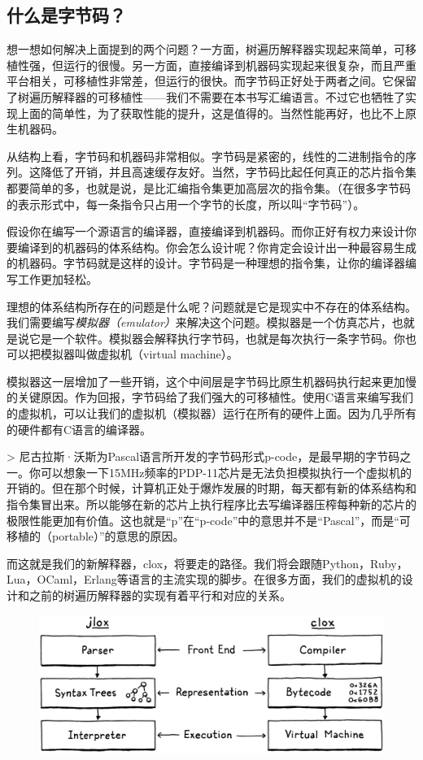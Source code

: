\documentclass[cn,10pt,math=newtx,citestyle=gb7714-2015,bibstyle=gb7714-2015]{elegantbook}
\begin{document}
\subsection{什么是字节码？}

想一想如何解决上面提到的两个问题？一方面，树遍历解释器实现起来简单，可移植性强，但运行的很慢。另一方面，直接编译到机器码实现起来很复杂，而且严重平台相关，可移植性非常差，但运行的很快。而字节码正好处于两者之间。它保留了树遍历解释器的可移植性——我们不需要在本书写汇编语言。不过它也牺牲了实现上面的简单性，为了获取性能的提升，这是值得的。当然性能再好，也比不上原生机器码。

从结构上看，字节码和机器码非常相似。字节码是紧密的，线性的二进制指令的序列。这降低了开销，并且高速缓存友好。当然，字节码比起任何真正的芯片指令集都要简单的多，也就是说，是比汇编指令集更加高层次的指令集。（在很多字节码的表示形式中，每一条指令只占用一个字节的长度，所以叫“字节码”）。

假设你在编写一个源语言的编译器，直接编译到机器码。而你正好有权力来设计你要编译到的机器码的体系结构。你会怎么设计呢？你肯定会设计出一种最容易生成的机器码。字节码就是这样的设计。字节码是一种理想的指令集，让你的编译器编写工作更加轻松。

理想的体系结构所存在的问题是什么呢？问题就是它是现实中不存在的体系结构。我们需要编写\textit{模拟器（emulator）}来解决这个问题。模拟器是一个仿真芯片，也就是说它是一个软件。模拟器会解释执行字节码，也就是每次执行一条字节码。你也可以把模拟器叫做虚拟机（virtual machine）。

模拟器这一层增加了一些开销，这个中间层是字节码比原生机器码执行起来更加慢的关键原因。作为回报，字节码给了我们强大的可移植性。使用C语言来编写我们的虚拟机，可以让我们的虚拟机（模拟器）运行在所有的硬件上面。因为几乎所有的硬件都有C语言的编译器。

> 尼古拉斯·沃斯为Pascal语言所开发的字节码形式p-code，是最早期的字节码之一。你可以想象一下15MHz频率的PDP-11芯片是无法负担模拟执行一个虚拟机的开销的。但在那个时候，计算机正处于爆炸发展的时期，每天都有新的体系结构和指令集冒出来。所以能够在新的芯片上执行程序比去写编译器压榨每种新的芯片的极限性能更加有价值。这也就是“p”在“p-code”中的意思并不是“Pascal”，而是“可移植的（portable）”的意思的原因。

而这就是我们的新解释器，clox，将要走的路径。我们将会跟随Python，Ruby，Lua，OCaml，Erlang等语言的主流实现的脚步。在很多方面，我们的虚拟机的设计和之前的树遍历解释器的实现有着平行和对应的关系。

\begin{figure}[h]
\centering
\includegraphics[width=\textwidth]{image/chunks-of-bytecode/phases.png}
\end{figure}
\end{document}
